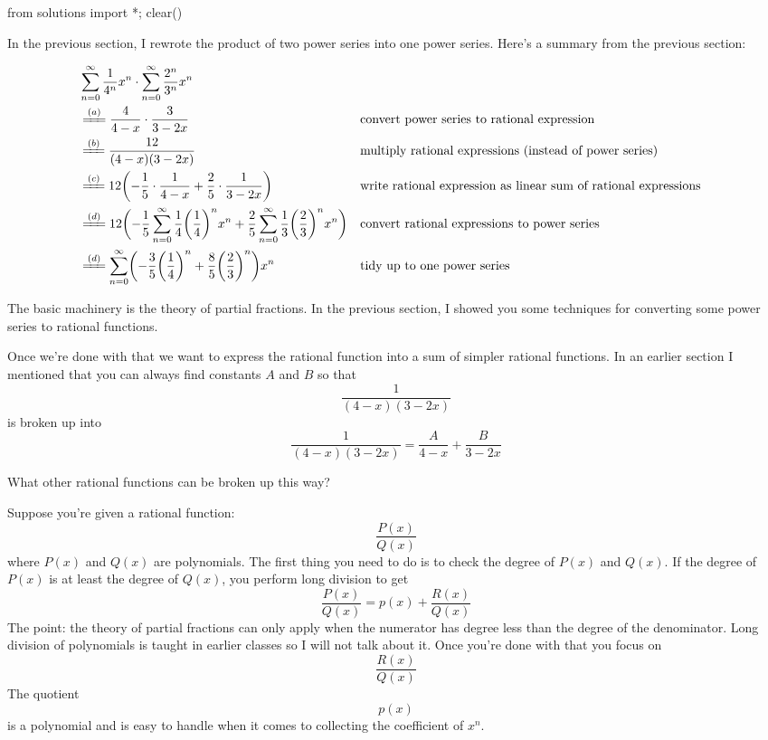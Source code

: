 \begin{python0}
from solutions import *; clear() 
\end{python0}

In the previous section, I rewrote the product of two power series into one
power series.
Here's a summary from the previous section:

{\footnotesize
\begin{align*}
&\tmpAA \\ 
&\xlongequal{(a)} \tmpBB & & \text{convert power series to rational expression} \\
&\xlongequal{(b)} \tmpCC & & \text{multiply rational expressions (instead of power series)}\\
&\xlongequal{(c)} \tmpDD & & \text{write rational expression as linear sum of rational expressions}\\
&\xlongequal{(d)} \tmpEE & & \text{convert rational expressions to power series} \\
&\xlongequal{(d)} \tmpFF & & \text{tidy up to one power series}
\end{align*}
}

The basic machinery is the theory of partial fractions.
In the previous section, I showed you some techniques for
converting some power series to rational functions.

Once we're done with that we want to express the rational function
into a sum of simpler rational functions.
In an earlier section I mentioned that you can always find constants
$A$ and $B$ so that
\[
\frac{1}{(4-x)(3-2x)}
\]
is broken up into
\[
\frac{1}{(4-x)(3-2x)}
=
\frac{A}{4-x} +
\frac{B}{3-2x}
\]

What other rational functions can be broken up this way?

Suppose you're given a rational function:
\[
\frac{P(x)}{Q(x)}
\]
where $P(x)$ and $Q(x)$ are polynomials.
The first thing you need to do is to check the degree of $P(x)$
and $Q(x)$.
If the degree of $P(x)$ is at least the degree of $Q(x)$,
you perform long division to get
\[
\frac{P(x)}{Q(x)} = p(x) + \frac{R(x)}{Q(x)}
\]
The point: the theory of partial fractions can only apply when
the numerator has degree less than the degree of the denominator.
Long division of polynomials is taught in earlier classes
so I will not talk about it.
Once you're done with that you focus on
\[
\frac{R(x)}{Q(x)}
\]
The quotient
\[
p(x)
\]
is a polynomial and is easy to handle when it comes to collecting the 
coefficient of $x^n$.


